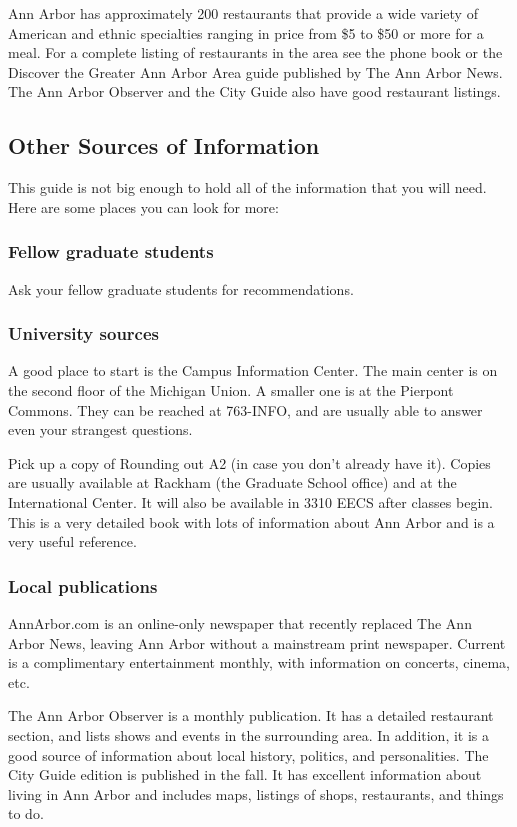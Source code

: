 \documentclass[11pt]{article}
\begin{document}
Ann Arbor has approximately 200 restaurants that provide a wide
variety of American and ethnic specialties ranging in price from \$5 to
\$50 or more for a meal.  For a complete listing of restaurants in the
area see the phone book or the Discover the Greater Ann Arbor Area
guide published by The Ann Arbor News. The Ann Arbor Observer and the
City Guide also have good restaurant listings.
\subsection{Other Sources of Information}
\label{sec-12_11}

This guide is not big enough to hold all of the information that you will need.  Here are some places you can look for more:
\subsubsection{Fellow graduate students}
\label{sec-12_11_1}

Ask your fellow graduate students for recommendations.
\subsubsection{University sources}
\label{sec-12_11_2}

A good place to start is the Campus Information Center.  The main
center is on the second floor of the Michigan Union.  A smaller one is
at the Pierpont Commons.  They can be reached at 763-INFO, and are
usually able to answer even your strangest questions.

Pick up a copy of Rounding out A2 (in case you don't already have it).
Copies are usually available at Rackham (the Graduate School office)
and at the International Center.  It will also be available in 3310
EECS after classes begin.  This is a very detailed book with lots of
information about Ann Arbor and is a very useful reference.
\subsubsection{Local publications}
\label{sec-12_11_3}

AnnArbor.com is an online-only newspaper that recently replaced The Ann Arbor News, leaving Ann Arbor without a mainstream print newspaper.
Current is a complimentary entertainment monthly, with information on
concerts, cinema, etc.

The Ann Arbor Observer is a monthly publication.  It has a detailed
restaurant section, and lists shows and events in the surrounding
area.  In addition, it is a good source of information about local
history, politics, and personalities.  The City Guide edition is
published in the fall.  It has excellent information about living in
Ann Arbor and includes maps, listings of shops, restaurants, and
things to do.
\end{document}
